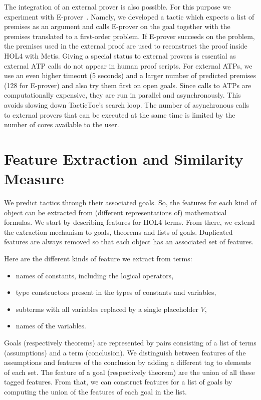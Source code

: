 \documentclass[runningheads,a4paper,draft]{svjour3}
\def\holfour{\textsf{HOL4}\xspace}
\def\eprover{\textsf{E-prover}\xspace}
\def\metis{\textsf{Metis}\xspace}
\def\tactictoe{\textsf{TacticToe}\xspace}
\begin{document}
The integration of an external prover is also possible. For this purpose we experiment
with
\eprover~\cite{eprover}.
Namely, we developed a tactic which expects a list of premises as an
argument
and calls \eprover on the goal together with the premises translated to a first-order problem. If \eprover
succeeds on the problem, the premises used in the external proof are used to
reconstruct the proof inside \holfour with \metis. Giving a special status
to external
provers is essential as external ATP calls do not appear in human
proof scripts. For external ATPs, we use an even higher timeout (5 seconds) and
a larger number of predicted premises (128 for \eprover) and also try them
first on open
goals. Since calls to ATPs are
computationally expensive, they are run in parallel and asynchronously. This
avoids slowing down \tactictoe's search loop. The number of asynchronous calls
to external provers that can be executed at the same time is limited by the
number of cores available to the user.

\section{Feature Extraction and Similarity Measure}\label{sec:features}

We predict tactics through their associated goals. So, the features
for each kind of object can be extracted from (different representations of)
mathematical formulas. We start by describing features for \holfour terms. From
there, we extend the extraction mechanism
to goals, theorems and lists of goals. Duplicated features are always removed
so that each object has an associated set of features.

Here are the different kinds of feature we extract from terms:
\begin{itemize}
\item names of constants, including the logical operators,
\item type constructors present in the types of constants and variables,
\item subterms with all variables replaced by a single placeholder $V$,
\item names of the variables.
\end{itemize}
Goals (respectively theorems) are represented by pairs consisting of a list of
terms (assumptions) and a term (conclusion). We distinguish between
features of the assumptions and features of the conclusion by adding a
different tag to elements of each set. The feature of a goal (respectively theorem)
are the union of all these tagged features. From
that, we can construct features for a list of goals by computing the union of the features of each goal in the list.
\end{document}
